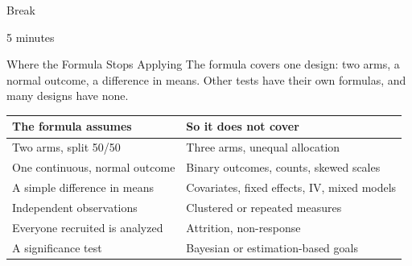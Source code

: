 \documentclass[
  ignorenonframetext,
  aspectratio=169,
]{beamer}
\begin{document}
\begin{frame}{Break}
\label{break}
\vspace{3em}

\begin{center}
\Large 5 minutes
\end{center}
\end{frame}

\begin{frame}{Where the Formula Stops Applying}
\label{where-the-formula-stops-applying}
\small The formula covers one design: two arms, a normal outcome, a
difference in means. Other tests have their own formulas, and many
designs have none.

\vspace{0.4em}

\begin{center}
\small
\setlength{\tabcolsep}{7pt}
\renewcommand{\arraystretch}{1.2}
\begin{tabular}{>{\raggedright\arraybackslash}p{5.3cm}>{\raggedright\arraybackslash}p{7.4cm}}
\toprule
\textbf{The formula assumes} & \textbf{So it does not cover} \\
\midrule
Two arms, split 50/50            & Three arms, unequal allocation \\
One continuous, normal outcome   & Binary outcomes, counts, skewed scales \\
A simple difference in means     & Covariates, fixed effects, IV, mixed models \\
Independent observations         & Clustered or repeated measures \\
Everyone recruited is analyzed   & Attrition, non-response \\
A significance test              & Bayesian or estimation-based goals \\
\bottomrule
\end{tabular}
\end{center}
\end{frame}
\end{document}
